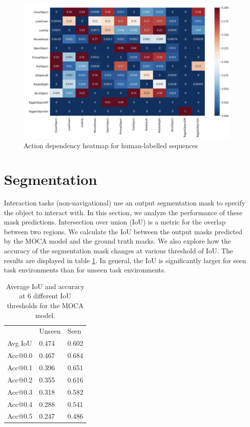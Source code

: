 \documentclass[11pt,a4paper]{article}
\begin{document}
 \begin{figure}
    \centering
    \includegraphics[width=\linewidth]{Reports/4-Analysis-of-Baselines/GROUND_codep.png}
    \caption{Action dependency heatmap for human-labelled sequences}
    \label{fig:GROUND_codep}
\end{figure}



\section{Segmentation}

Interaction tasks (non-navigational) use an output segmentation mask to specify the object to interact with. In this section, we analyze the performance of these mask predictions. Intersection over union (IoU) is a metric for the overlap between two regions. We calculate the IoU between the output masks predicted by the MOCA model and the ground truth masks. We also explore how the accuracy of the segmentation mask changes at various threshold of IoU. The results are displayed in table \ref{tab:seg_acc}. In general, the IoU is significantly larger for seen task environments than for unseen task environments.



\begin{table}[]
\centering
\begin{tabular}{lll}
        & Unseen & Seen  \\
Avg IoU & 0.474  & 0.602 \\
Acc@0.0 & 0.467  & 0.684 \\
Acc@0.1 & 0.396  & 0.651 \\
Acc@0.2 & 0.355  & 0.616 \\
Acc@0.3 & 0.318  & 0.582 \\
Acc@0.4 & 0.288  & 0.541 \\
Acc@0.5 & 0.247  & 0.486
\end{tabular}
\caption{Average IoU and accuracy at 6 different IoU thresholds for the MOCA model.}
\label{tab:seg_acc}
\end{table}
\end{document}
